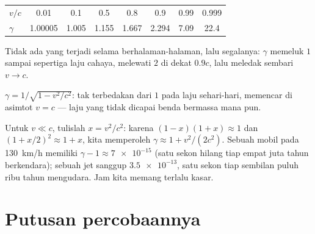 \begin{example}\label{ex:g12:special-relativity:gammatable}
\begin{center}\small
\begin{tabular}{lccccccc}
$v/c$    & 0.01     & 0.1   & 0.5   & 0.8   & 0.9   & 0.99 & 0.999\\
$\gamma$ & 1.00005 & 1.005 & 1.155 & 1.667 & 2.294 & 7.09 & 22.4
\end{tabular}
\end{center}
Tidak ada yang terjadi selama berhalaman-halaman, lalu segalanya: $\gamma$ memeluk $1$ sampai sepertiga
laju cahaya, melewati $2$ di dekat $0.9c$, lalu meledak sembari $v \to c$.
\end{example}

\begin{omfigure}

{\small $\gamma = 1/\sqrt{1 - v^2/c^2}$: tak terbedakan dari $1$ pada laju
sehari-hari, memencar di asimtot $v = c$ --- laju yang tidak dicapai benda bermassa mana pun.}
\end{omfigure}

\begin{remark}\label{rem:g12:special-relativity:everyday}
Untuk $v \ll c$, tulislah $x = v^2/c^2$: karena $(1-x)(1+x) \approx 1$ dan
$(1 + x/2)^2 \approx 1 + x$, kita memperoleh $\gamma \approx 1 + v^2/(2c^2)$. Sebuah mobil
pada \qty{130}{km/h} memiliki $\gamma - 1 \approx \num{7e-15}$ (satu sekon hilang
tiap empat juta tahun berkendara); sebuah jet sanggup $\num{3.5e-13}$, satu
sekon tiap sembilan puluh ribu tahun mengudara. Jam kita memang terlalu kasar.
\end{remark}

\section{Putusan percobaannya}

